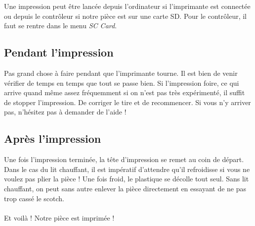 Une impression peut être lancée depuis l'ordinateur si l'imprimante est connectée ou depuis le contrôleur si notre pièce est sur une carte SD. Pour le contrôleur, il faut se rentre dans le menu \emph{SC Card}.

\subsection{Pendant l'impression}

Pas grand chose à faire pendant que l'imprimante tourne. Il est bien de venir vérifier de temps en temps que tout se passe bien. Si l'impression foire, ce qui arrive quand même assez fréquemment si on n'est pas très expérimenté, il suffit de stopper l'impression. De corriger le tire et de recommencer. Si vous n'y arriver pas, n'hésitez pas à demander de l'aide !

\subsection{Après l'impression}

Une fois l'impression terminée, la tête d'impression se remet au coin de départ. Dans le cas du lit chauffant, il est impératif d'attendre qu'il refroidisse si vous ne voulez pas plier la pièce ! Une fois froid, le plastique se décolle tout seul. Sans lit chauffant, on peut sans autre enlever la pièce directement en essayant de ne pas trop cassé le scotch.

\paragraph{} Et voilà ! Notre pièce est imprimée !